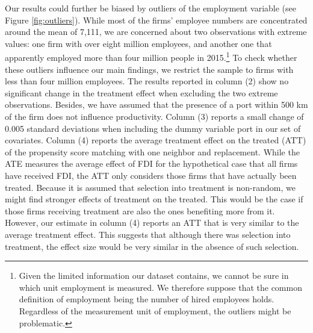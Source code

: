\documentclass[a4paper,11pt]{scrartcl}
\begin{document}
Our results could further be biased by outliers of the employment variable (see Figure \ref{fig:outliers}). While most of the firms' employee numbers are concentrated around the mean of 7,111, we are concerned about two observations with extreme values: one firm with over eight million employees, and another one that apparently employed more than four million people in 2015.\footnote{Given the limited information our dataset contains, we cannot be sure in which unit employment is measured. We therefore suppose that the common definition of employment being the number of hired employees holds. Regardless of the measurement unit of employment, the outliers might be problematic.}  To check whether these outliers influence our main findings, we restrict the sample to firms with less than four million employees. The results reported in column (2) show no significant change in the treatment effect when excluding the two extreme observations. %
Besides, we have assumed that the presence of a port within 500 km of the firm does not influence productivity. Column (3) reports a small change of 0.005 standard deviations when including the dummy variable port in our set of covariates. 
Column (4) reports the average treatment effect on the treated (ATT) of the propensity score matching with one neighbor and replacement. While the ATE measures the average effect of FDI for the hypothetical case that all firms have received FDI, the ATT only considers those firms that have actually been treated. Because it is assumed that selection into treatment is non-random, we might find stronger effects of treatment on the treated. This would be the case if those firms receiving treatment are also the ones benefiting more from it. However, our estimate in column (4) reports an ATT that is very similar to the average treatment effect. This suggests that although there was selection into treatment, the effect size would be very similar in the absence of such selection. 
\end{document}
